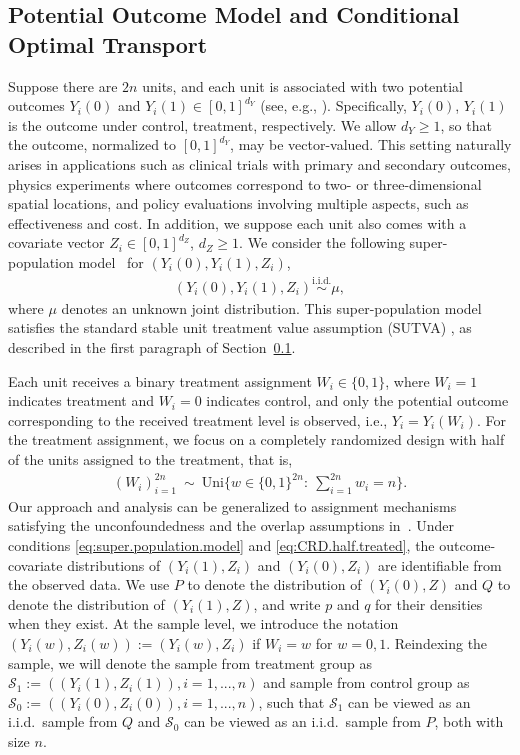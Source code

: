 \documentclass{article}
\theoremstyle{plain}
\theoremstyle{definition}
\def\PP{P}
\def\QQ{Q}
\def\calS{\mathcal{S}}
\theoremstyle{plain}
\def\calS{\mathcal{S}}
\begin{document}
\subsection{Potential Outcome Model and Conditional Optimal Transport}\label{sec:potential.outcome.model}
Suppose there are $2n$ units, and each unit is associated with two potential outcomes \( Y_i(0) \) and \( Y_i(1) \in [0,1]^{d_Y} \) (see, e.g., \parencite{rubin1974estimating}). Specifically, \( Y_i(0) \), \( Y_i(1) \) is the outcome under control, treatment, respectively.
We allow $d_Y \ge 1$, so that the outcome, normalized to $[0,1]^{d_Y}$, may be vector-valued.
This setting naturally arises in applications such as clinical trials with primary and secondary outcomes,
physics experiments where outcomes correspond to two- or three-dimensional spatial locations,
and policy evaluations involving multiple aspects, such as effectiveness and cost.
In addition, we suppose each unit also comes with a covariate vector \( Z_i \in [0,1]^{d_Z} \), \( d_Z \ge 1 \).
We consider the following super-population model~\parencite{imbens2015causal} for $(Y_i(0), Y_i(1), Z_i)$,
\begin{align}\label{eq:super.population.model}
    (Y_i(0), Y_i(1), Z_i)
    \stackrel{\mathrm{i.i.d.}}{\sim} \mu,
\end{align}
where $\mu$ denotes an unknown joint distribution.
This super-population model satisfies the standard stable unit treatment value assumption (SUTVA) \parencite{imbens2015causal}, as described in the first paragraph of Section~\ref{sec:potential.outcome.model}.


Each unit receives a binary treatment assignment \( W_i \in \{0,1\} \), where \( W_i = 1 \) indicates treatment and \( W_i = 0 \) indicates control, and only the potential outcome corresponding to the received treatment level is observed, i.e., \( Y_i=Y_i(W_i) \).
For the treatment assignment, we focus on a completely randomized design with half of the units assigned to the treatment, that is,
\begin{align}\label{eq:CRD.half.treated}
    (W_i)_{i=1}^{2n}\ \sim\ \mathrm{Uni}\Big\{ w\in\{0,1\}^{2n}:\ \sum_{i=1}^{2n} w_i=n\Big\}.
\end{align}
Our approach and analysis can be generalized to assignment mechanisms satisfying the unconfoundedness and the overlap assumptions in~\cite{imbens2015causal}.
Under conditions \eqref{eq:super.population.model} and \eqref{eq:CRD.half.treated}, the outcome-covariate distributions of \( (Y_i(1), Z_i) \) and \( (Y_i(0), Z_i) \) are identifiable from the observed data. 
We use $P$ to denote the distribution of $(Y_i(0), Z)$ and $Q$ to denote the distribution of $(Y_i(1), Z)$, and write $p$ and $q$ for their densities when they exist. 
At the sample level, we introduce the notation $(Y_i(w), Z_i(w)) := (Y_i(w), Z_i)$ if $W_i = w$ for $w = 0,1$. Reindexing the sample, we will denote the sample from treatment group as $\calS_{1} := ((Y_i(1), Z_i(1)), i=1,...,n)$ and sample from control group as  $\calS_{0} :=((Y_i(0), Z_i(0)), i=1,...,n)$, such that $\calS_1$ can be viewed as an i.i.d.~sample from $\QQ$ and $\calS_0$ can be viewed as an i.i.d.~sample from $\PP$, both with size $n$.
\end{document}
